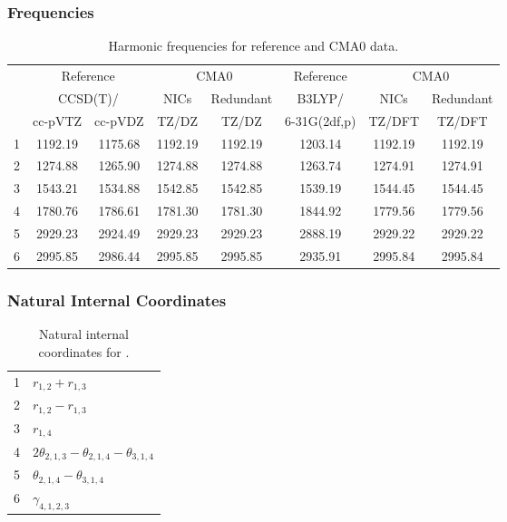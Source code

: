 \documentclass[10pt,oneside]{article}
\begin{document}
\begin{table}[h!]
\subsubsection*{Frequencies}
\centering
\caption{Harmonic frequencies for reference and CMA0 data.}
\begin{tabular}{cccccccc}
\toprule
{} & \multicolumn{2}{c}{Reference} & \multicolumn{2}{c}{CMA0} &    Reference & \multicolumn{2}{c}{CMA0} \\
{} & \multicolumn{2}{c}{CCSD(T)/} &    NICs &  Redundant &       B3LYP/ &    NICs & Redundant \\
{} &   cc-pVTZ & cc-pVDZ &   TZ/DZ &      TZ/DZ & 6-31G(2df,p) &  TZ/DFT &    TZ/DFT \\
\midrule
1 &   1192.19 & 1175.68 & 1192.19 &    1192.19 &      1203.14 & 1192.19 &   1192.19 \\
2 &   1274.88 & 1265.90 & 1274.88 &    1274.88 &      1263.74 & 1274.91 &   1274.91 \\
3 &   1543.21 & 1534.88 & 1542.85 &    1542.85 &      1539.19 & 1544.45 &   1544.45 \\
4 &   1780.76 & 1786.61 & 1781.30 &    1781.30 &      1844.92 & 1779.56 &   1779.56 \\
5 &   2929.23 & 2924.49 & 2929.23 &    2929.23 &      2888.19 & 2929.22 &   2929.22 \\
6 &   2995.85 & 2986.44 & 2995.85 &    2995.85 &      2935.91 & 2995.84 &   2995.84 \\
\bottomrule
\end{tabular}
\end{table}

\begin{table}[h!]
\subsubsection*{Natural Internal Coordinates}
\centering
\caption{Natural internal coordinates for .}
\small
\begin{tabular}{ll}
\toprule
  1   & $r_{1,2} + r_{1,3}$ \\
  2   & $r_{1,2} - r_{1,3}$ \\
  3   & $r_{1,4}$ \\
  4   & $2\theta_{2,1,3} - \theta_{2,1,4} - \theta_{3,1,4}$ \\
  5   & $\theta_{2,1,4} - \theta_{3,1,4}$ \\
  6   & $\gamma_{4,1,2,3}$ \\
\bottomrule
\end{tabular}
\end{table}
\end{document}
